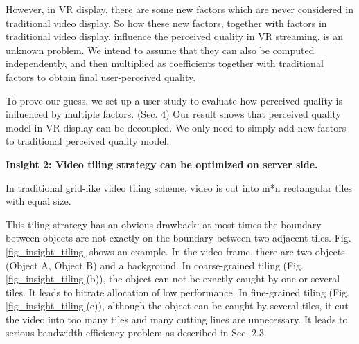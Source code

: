 However, in VR display, there are some new factors which are never considered in traditional video display. So how these new factors, together with factors in traditional video display, influence the perceived quality in VR streaming, is an unknown problem. We intend to assume that they can also be computed independently, and then multiplied as coefficients together with traditional factors to obtain final user-perceived quality.

To prove our guess, we set up a user study to evaluate how perceived quality is influenced by multiple factors. (Sec. 4) Our result shows that perceived quality model in VR display can be decoupled. We only need to simply add new factors to traditional perceived quality model.

\textbf{Insight 2: Video tiling strategy can be optimized on server side.}

In traditional grid-like video tiling scheme, video is cut into m*n rectangular tiles with equal size. 

This tiling strategy has an obvious drawback: at most times the boundary between objects are not exactly on the boundary between two adjacent tiles. Fig. \ref{fig_insight_tiling} shows an example. In the video frame, there are two objects (Object A, Object B) and a background. In coarse-grained tiling (Fig. \ref{fig_insight_tiling}(b)), the object can not be exactly caught by one or several tiles. It leads to bitrate allocation of low performance. In fine-grained tiling (Fig. \ref{fig_insight_tiling}(c)), although the object can be caught by several tiles, it cut the video into too many tiles and many cutting lines are unnecessary. It leads to serious bandwidth efficiency problem as described in Sec. 2.3.

